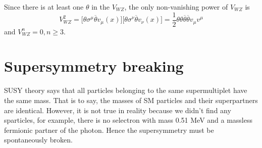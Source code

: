 \documentclass[12pt]{report}
\begin{document}
Since there is at least one $\theta$ in the $V_{WZ}$, the only non-vanishing power of $V_{WZ}$ is
\begin{equation}
V^{2}_{WZ} = \big[ \theta \sigma^{\mu} \overline{\theta} v_{\mu}(x) \big] \big[ \theta \sigma^{\nu} \overline{\theta} v_{\nu}(x) \big] = \frac{1}{2} \theta \theta \overline{\theta} \overline{\theta} v_{\mu} v^{\mu}
\end{equation}
and $V^{n}_{WZ} = 0, n \ge 3$.









\chapter{Supersymmetry breaking}

SUSY theory says that all particles belonging to the same supermultiplet have the same mass.
That is to say, the masses of SM particles and their superpartners are identical.
However, it is not true in reality because we didn't find any sparticles, for example, there is no selectron with mass 0.51 MeV and a massless fermionic partner of the photon.
Hence the supersymmetry must be spontaneously broken.
\end{document}
